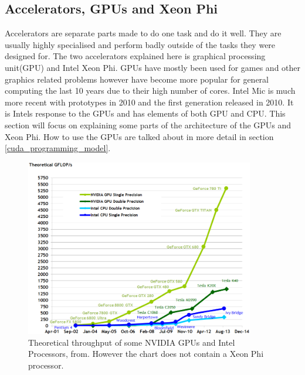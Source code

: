 \documentclass[10pt,a4paper]{report}
\begin{document}
\subsection{Accelerators, GPUs and Xeon Phi}
\label{gpu}
Accelerators are separate parts made to do one task and do it well. They are usually highly specialised and perform badly outside of the tasks they were designed for. The two accelerators explained here is graphical processing unit(GPU) and Intel Xeon Phi\cite{cuda, jeffers2013intel}. GPUs have mostly been used for games and other graphics related problems however have become more popular for general computing the last 10 years due to their high number of cores\cite{cuda}.  Intel Mic is much more recent with prototypes in 2010 and the first generation released in 2010\cite{jeffers2013intel}. It is Intels response to the GPUs and has elements of both GPU and CPU\cite{jeffers2013intel}. This section will focus on explaining some parts of the architecture of the GPUs and Xeon Phi. How to use the GPUs are talked about in more detail in section \ref{cuda_programming_model}.

\begin{figure}[h]
    \centering
    \includegraphics[width=10cm]{floating-point-operations-per-second.png}
    \caption{Theoretical throughput of some NVIDIA GPUs and Intel Processors, from\cite{cuda}. However the chart does not contain a Xeon Phi processor.}
    \label{fig:gpu_vs_cpu}
\end{figure}
\end{document}
